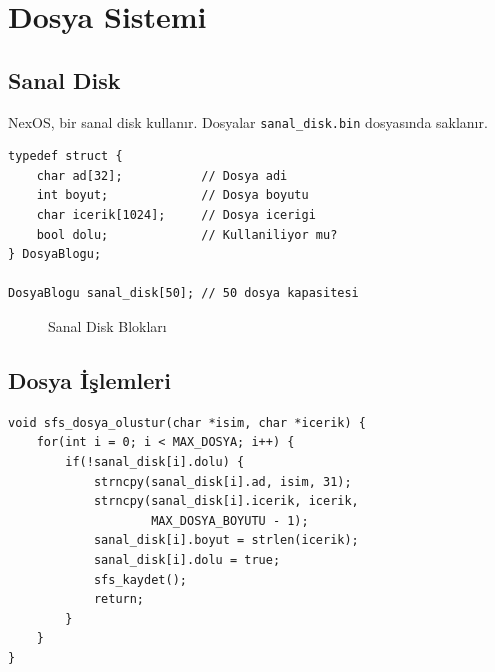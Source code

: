 \documentclass[12pt,a4paper]{report}
\begin{document}
\chapter{Dosya Sistemi}

\section{Sanal Disk}

NexOS, bir sanal disk kullanır. Dosyalar \texttt{sanal\_disk.bin} dosyasında saklanır.

\begin{lstlisting}[caption={Dosya Blogu Yapisi}]
typedef struct {
    char ad[32];           // Dosya adi
    int boyut;             // Dosya boyutu
    char icerik[1024];     // Dosya icerigi
    bool dolu;             // Kullaniliyor mu?
} DosyaBlogu;

DosyaBlogu sanal_disk[50]; // 50 dosya kapasitesi
\end{lstlisting}

\begin{figure}[h]
\centering
{}
\caption{Sanal Disk Blokları}
\end{figure}

\section{Dosya İşlemleri}

\begin{lstlisting}[caption={Dosya Olusturma}]
void sfs_dosya_olustur(char *isim, char *icerik) {
    for(int i = 0; i < MAX_DOSYA; i++) {
        if(!sanal_disk[i].dolu) {
            strncpy(sanal_disk[i].ad, isim, 31);
            strncpy(sanal_disk[i].icerik, icerik,
                    MAX_DOSYA_BOYUTU - 1);
            sanal_disk[i].boyut = strlen(icerik);
            sanal_disk[i].dolu = true;
            sfs_kaydet();
            return;
        }
    }
}
\end{lstlisting}
\end{document}
